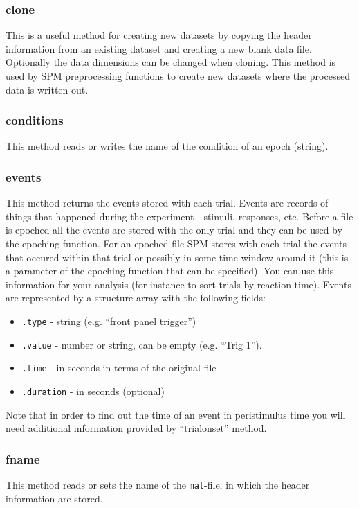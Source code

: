 \subsubsection{clone}
This is a useful method for creating new datasets by copying the header information from an existing dataset and creating a new blank data file. Optionally the data dimensions can be changed when cloning. This method is used by SPM preprocessing functions to create new datasets where the processed data is written out.

\subsubsection{conditions}
This method  reads or writes the name of the condition of an epoch (string).

\subsubsection{events}
This method returns the events stored with each trial. Events are records of things that happened during the experiment - stimuli, responses, etc. Before a file is epoched all the events are stored with the only trial and they can be used by the epoching function. For an epoched file SPM stores with each trial the events that occured within that trial or possibly in some time window around it (this is a parameter of the epoching function that can be specified). You can use this information for your analysis (for instance to sort trials by reaction time). Events are represented by a structure array with the following fields:

\begin{itemize}
\item \texttt{.type} - string (e.g. ``front panel trigger'')
\item \texttt{.value} - number or string, can be empty (e.g. ``Trig 1'').
\item \texttt{.time} - in seconds in terms of the original file
\item \texttt{.duration} - in seconds (optional)
\end{itemize}

Note that in order to find out the time of an event in peristimulus time you will need additional information provided by ``trialonset'' method.

\subsubsection{fname}
This method reads or sets the name of the \texttt{mat}-file, in which the header information are stored.

